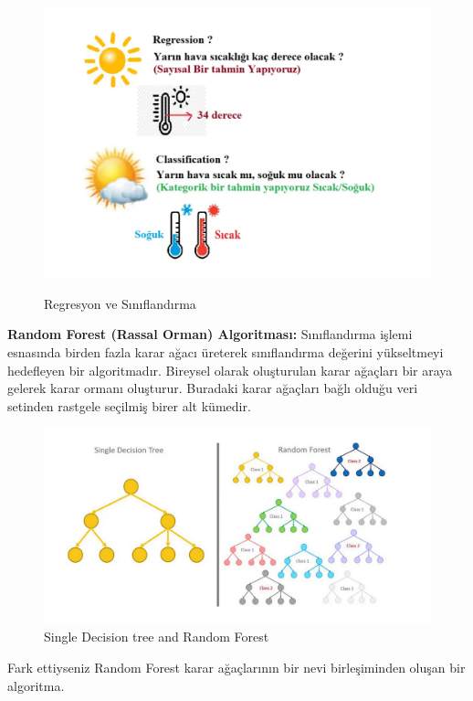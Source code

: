 \documentclass[12pt, a4paper]{article}
\begin{document}
\begin{figure}[!htbp] 
	\caption{ Regresyon ve Sınıflandırma  }
	\centering
	\includegraphics[angle=0, width=\textwidth]{resim4.png}
	\label{dogruluk}
\end{figure} 


\newpage \textbf{Random Forest (Rassal Orman) Algoritması:} 
Sınıflandırma işlemi esnasında birden fazla karar ağacı üreterek sınıflandırma değerini yükseltmeyi hedefleyen bir algoritmadır. Bireysel olarak oluşturulan karar ağaçları bir araya gelerek karar ormanı oluşturur. Buradaki karar ağaçları bağlı olduğu veri setinden rastgele seçilmiş birer alt kümedir.
\begin{figure}[!htbp] 
	\caption{ Single Decision tree and Random Forest }
	\centering
	\includegraphics[angle=0, width=\textwidth]{resim5.png}
	
\end{figure} \newline
Fark ettiyseniz Random Forest karar ağaçlarının bir nevi birleşiminden oluşan bir algoritma.\cite{site4}
\newpage
\end{document}
